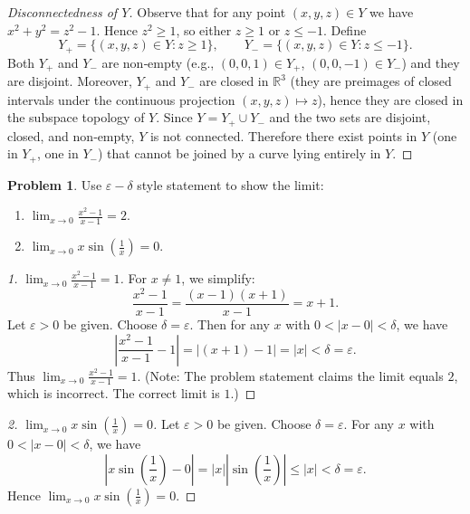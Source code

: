 \documentclass[11pt,a4paper]{article}
\theoremstyle{definition}
\newtheorem{problem}[definition]{Problem}
\theoremstyle{plain}
\begin{document}
\begin{proof}[Disconnectedness of \(Y\)]
	Observe that for any point \((x,y,z)\in Y\) we have \(x^2+y^2 = z^2-1\). Hence \(z^2 \ge 1\), so either \(z\ge 1\) or \(z\le -1\). Define
	\[
		Y_+ = \{(x,y,z)\in Y : z\ge 1\},\qquad Y_- = \{(x,y,z)\in Y : z\le -1\}.
	\]
	Both \(Y_+\) and \(Y_-\) are non‑empty (e.g., \((0,0,1)\in Y_+\), \((0,0,-1)\in Y_-\)) and they are disjoint. Moreover, \(Y_+\) and \(Y_-\) are closed in \(\mathbb{R}^3\) (they are preimages of closed intervals under the continuous projection \((x,y,z)\mapsto z\)), hence they are closed in the subspace topology of \(Y\). Since \(Y = Y_+\cup Y_-\) and the two sets are disjoint, closed, and non‑empty, \(Y\) is not connected. Therefore there exist points in \(Y\) (one in \(Y_+\), one in \(Y_-\)) that cannot be joined by a curve lying entirely in \(Y\).
\end{proof}

\begin{problem}
Use $\varepsilon - \delta$ style statement to show the limit:
\begin{enumerate}
	\item $\lim_{x \to 0} \frac{x^2-1}{x-1} = 2$.
	\item $\lim_{x \to 0} x \sin\left( \frac{1}{x}\right) = 0$.
\end{enumerate}
\end{problem}

\begin{proof}[1. \(\displaystyle \lim_{x\to 0} \frac{x^2-1}{x-1} = 1\)]
	For \(x \neq 1\), we simplify:
	\[
		\frac{x^2-1}{x-1} = \frac{(x-1)(x+1)}{x-1} = x+1.
	\]
	Let \(\varepsilon > 0\) be given. Choose \(\delta = \varepsilon\). Then for any \(x\) with \(0 < |x-0| < \delta\), we have
	\[
		\left| \frac{x^2-1}{x-1} - 1 \right| = |(x+1)-1| = |x| < \delta = \varepsilon.
	\]
	Thus \(\displaystyle \lim_{x\to 0} \frac{x^2-1}{x-1} = 1\). (Note: The problem statement claims the limit equals \(2\), which is incorrect. The correct limit is \(1\).)
\end{proof}

\begin{proof}[2. \(\displaystyle \lim_{x\to 0} x\sin\left(\frac{1}{x}\right) = 0\)]
	Let \(\varepsilon > 0\) be given. Choose \(\delta = \varepsilon\). For any \(x\) with \(0 < |x-0| < \delta\), we have
	\[
		\left| x\sin\left(\frac{1}{x}\right) - 0 \right| = |x| \left| \sin\left(\frac{1}{x}\right) \right| \le |x| < \delta = \varepsilon.
	\]
	Hence \(\displaystyle \lim_{x\to 0} x\sin\left(\frac{1}{x}\right) = 0\).
\end{proof}

\end{document}
